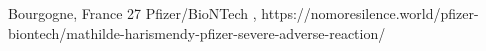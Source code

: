           {Bourgogne, France}
          {27}
          {Pfizer/BioNTech}
          {}
          {
            ,
          }
          {https://nomoresilence.world/pfizer-biontech/mathilde-harismendy-pfizer-severe-adverse-reaction/}
